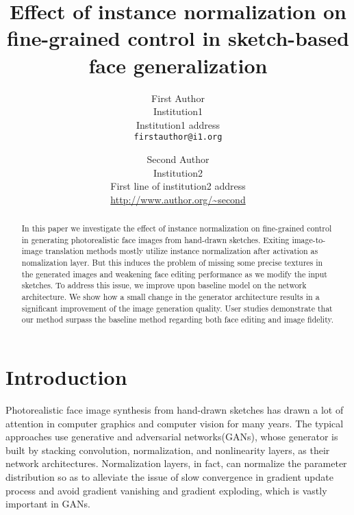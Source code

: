 \documentclass[10pt,twocolumn,letterpaper]{article}
\begin{document}
\title{Effect of instance normalization on fine-grained control in sketch-based face generalization}

\author{First Author\\
Institution1\\
Institution1 address\\
{\tt\small firstauthor@i1.org}
\and
Second Author\\
Institution2\\
First line of institution2 address\\
{\small\url{http://www.author.org/~second}}
}

\maketitle

\begin{abstract}
    In this paper we investigate the effect of instance normalization on fine-grained control in generating photorealistic face images from hand-drawn sketches. Exiting image-to-image translation methods mostly utilize instance normalization after activation as nomalization layer.
    But this induces the problem of missing some precise textures in the generated images and weakening face editing performance as we modify the input sketches. To address this issue, we improve upon baseline model on the network architecture. We show how a small change in the generator architecture results in a significant improvement of the image generation quality.  
    User studies demonstrate that our method surpass the baseline method regarding both face editing and image fidelity.
    
\end{abstract}

\section{Introduction}
Photorealistic face image synthesis from hand-drawn sketches has drawn a lot of attention in computer graphics and computer vision for many years. The typical approaches use generative and adversarial networks(GANs)\cite{gan}, whose generator is built by stacking convolution, normalization, and nonlinearity layers, as their network architectures. Normalization layers, in fact, can normalize the parameter distribution so as to alleviate the issue of slow convergence in gradient update process and avoid gradient vanishing and gradient exploding,  which is vastly important in GANs.
\end{document}
